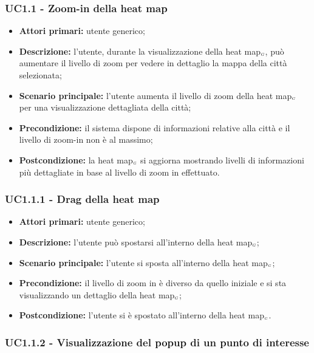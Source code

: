 \subsubsection{UC1.1 - Zoom-in della heat map}\label{CasiDUsoCasiDUsoTraUnUtenteEIlFrontEndElencoCasiDUsoUC11ZoomInDellaHeatMap}

\begin{itemize}
	\item \textbf{Attori primari:} utente generico;
	\item \textbf{Descrizione:} l’utente, durante la visualizzazione della heat map$_{\scaleto{G}{3pt}}$, può aumentare il livello di zoom per vedere in dettaglio la mappa della città selezionata;
	\item \textbf{Scenario principale:} l’utente aumenta il livello di zoom della heat map$_{\scaleto{G}{3pt}}$ per una visualizzazione dettagliata della città;
	\item \textbf{Precondizione:} il sistema dispone di informazioni relative alla città e il livello di zoom-in non è al massimo;
	\item \textbf{Postcondizione:} la heat map$_{\scaleto{G}{3pt}}$ si aggiorna mostrando livelli di informazioni più dettagliate in base al livello di zoom in effettuato.
\end{itemize}

\subsubsection{UC1.1.1 - Drag della heat map}\label{CasiDUsoCasiDUsoTraUnUtenteEIlFrontEndElencoCasiDUsoUC111DragDellaHeatMap}

\begin{itemize}
	\item \textbf{Attori primari:} utente generico;
	\item \textbf{Descrizione:} l’utente può spostarsi all’interno della heat map$_{\scaleto{G}{3pt}}$;
	\item \textbf{Scenario principale:} l’utente si sposta all’interno della heat map$_{\scaleto{G}{3pt}}$;
	\item \textbf{Precondizione:} il livello di zoom in è diverso da quello iniziale e si sta visualizzando un dettaglio della heat map$_{\scaleto{G}{3pt}}$;
	\item \textbf{Postcondizione:} l’utente si è spostato all’interno della heat map$_{\scaleto{G}{3pt}}$.
\end{itemize}

\subsubsection{UC1.1.2 - Visualizzazione del popup di un punto di interesse}\label{CasiDUsoCasiDUsoTraUnUtenteEIlFrontEndElencoCasiDUsoUC112VisualizzazioneDelPopupDiUnPuntoDiInteresse}

